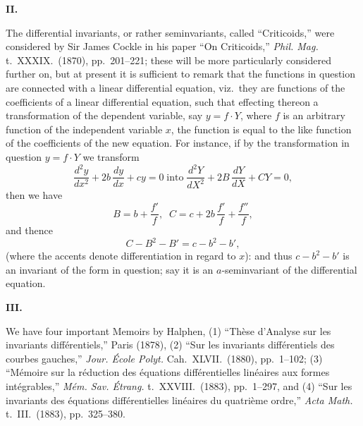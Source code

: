 \documentclass[11pt]{article}
\begin{document}
\medskip
\textbf{II.}

The differential invariants, or rather seminvariants, called ``Criticoids,'' were considered by Sir James Cockle in his paper ``On Criticoids,'' \textit{Phil. Mag.} t.\ XXXIX.\ (1870), pp.\ 201--221; these will be more particularly considered further on, but at present it is sufficient to remark that the functions in question are connected with a linear differential equation, viz.\ they are functions of the coefficients of a linear differential equation, such that effecting thereon a transformation of the dependent variable, say $y = f\cdot Y$, where $f$ is an arbitrary function of the independent variable $x$, the function is equal to the like function of the coefficients of the new equation. For instance, if by the transformation in question $y = f\cdot Y$ we transform
\[ \frac{d^2y}{dx^2} + 2b\,\frac{dy}{dx} + cy = 0\;\text{into}\;\frac{d^2Y}{dX^2} + 2B\,\frac{dY}{dX} + CY = 0, \]
then we have
\[ B = b + \frac{f'}{f},\;\; C = c + 2b\,\frac{f'}{f} + \frac{f''}{f}, \]
and thence
\[ C - B^2 - B' = c - b^2 - b', \]
(where the accents denote differentiation in regard to $x$): and thus $c - b^2 - b'$ is an invariant of the form in question; say it is an $a$-seminvariant of the differential equation.

\medskip
\textbf{III.}

We have four important Memoirs by Halphen, (1) ``Th\`ese d'Analyse sur les invariants diff\'erentiels,'' Paris (1878), (2) ``Sur les invariants diff\'erentiels des courbes gauches,'' \textit{Jour. \'Ecole Polyt.} Cah.\ XLVII.\ (1880), pp.\ 1--102; (3) ``M\'emoire sur la r\'eduction des \'equations diff\'erentielles lin\'eaires aux formes int\'egrables,'' \textit{M\'em. Sav. \'Etrang.} t.\ XXVIII.\ (1883), pp.\ 1--297, and (4) ``Sur les invariants des \'equations diff\'erentielles lin\'eaires du quatri\`eme ordre,'' \textit{Acta Math.} t.\ III.\ (1883), pp.\ 325--380.
\end{document}
